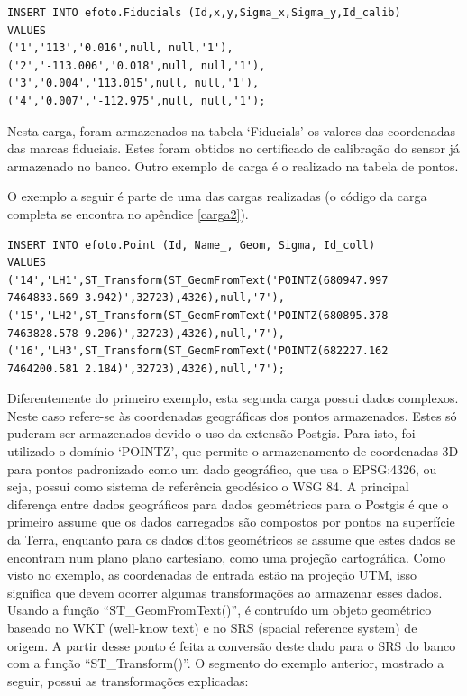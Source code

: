 \begin{lstlisting}
INSERT INTO efoto.Fiducials (Id,x,y,Sigma_x,Sigma_y,Id_calib)
VALUES
('1','113','0.016',null, null,'1'),
('2','-113.006','0.018',null, null,'1'),
('3','0.004','113.015',null, null,'1'),
('4','0.007','-112.975',null, null,'1');
\end{lstlisting}

Nesta carga, foram armazenados na tabela `Fiducials' os valores das coordenadas das marcas fiduciais. Estes foram obtidos no certificado de calibração do sensor já armazenado no banco. Outro exemplo de carga é o realizado na tabela de pontos. 

O exemplo a seguir é parte de uma das cargas realizadas (o código da carga completa se encontra no apêndice \ref{carga2}).

\begin{lstlisting}
INSERT INTO efoto.Point (Id, Name_, Geom, Sigma, Id_coll)
VALUES
('14','LH1',ST_Transform(ST_GeomFromText('POINTZ(680947.997 7464833.669 3.942)',32723),4326),null,'7'),
('15','LH2',ST_Transform(ST_GeomFromText('POINTZ(680895.378 7463828.578 9.206)',32723),4326),null,'7'),
('16','LH3',ST_Transform(ST_GeomFromText('POINTZ(682227.162 7464200.581 2.184)',32723),4326),null,'7');
\end{lstlisting}

Diferentemente do primeiro exemplo, esta segunda carga possui dados complexos. Neste caso refere-se às coordenadas geográficas dos pontos armazenados.  Estes só puderam ser armazenados devido o uso da extensão Postgis. Para isto, foi utilizado o domínio `POINTZ', que permite o armazenamento de coordenadas 3D para pontos padronizado como um dado geográfico, que usa o EPSG:4326, ou seja, possui como sistema de referência geodésico o WSG 84. A principal diferença entre dados geográficos para dados geométricos para o Postgis é que o primeiro assume que os dados carregados são compostos por pontos na superfície da Terra, enquanto para os dados ditos geométricos se assume que estes dados se encontram num plano plano cartesiano, como uma projeção cartográfica. 
Como visto no exemplo, as coordenadas de entrada estão na projeção UTM, isso significa que devem ocorrer algumas transformações ao armazenar esses dados. Usando a função ``ST\_GeomFromText()'', é contruído um objeto geométrico baseado no WKT (well-know text) e no SRS (spacial reference system) de origem. A partir desse ponto é feita a conversão deste dado para o SRS do banco com a função ``ST\_Transform()''. O segmento do exemplo anterior, mostrado a seguir, possui as transformações explicadas:

